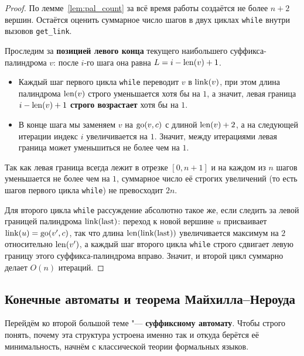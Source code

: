 \begin{proof}
    По лемме~\ref{lem:pal_count} за всё время работы создаётся не более $n + 2$ вершин. Остаётся оценить суммарное число шагов в двух циклах \texttt{while} внутри вызовов \texttt{get\_link}.

    Проследим за \textbf{позицией левого конца} текущего наибольшего суффикса-палиндрома $v$: после $i$-го шага она равна $L = i - \operatorname{len}(v) + 1$.
    \begin{itemize}
        \item Каждый шаг первого цикла \texttt{while} переводит $v$ в $\operatorname{link}(v)$, при этом длина палиндрома $\operatorname{len}(v)$ строго уменьшается хотя бы на $1$, а значит, левая граница $i - \operatorname{len}(v) + 1$ \textbf{строго возрастает} хотя бы на $1$.
        \item В конце шага мы заменяем $v$ на $\operatorname{go}(v, c)$ с длиной $\operatorname{len}(v) + 2$, а на следующей итерации индекс $i$ увеличивается на $1$. Значит, между итерациями левая граница может уменьшиться не более чем на $1$.
    \end{itemize}
    Так как левая граница всегда лежит в отрезке $[0, n + 1]$ и на каждом из $n$ шагов уменьшается не более чем на $1$, суммарное число её строгих увеличений (то есть шагов первого цикла \texttt{while}) не превосходит $2n$.

    Для второго цикла \texttt{while} рассуждение абсолютно такое же, если следить за левой границей палиндрома $\operatorname{link}(\text{last})$: переход к новой вершине $u$ присваивает $\operatorname{link}(u) = \operatorname{go}(v', c)$, так что длина $\operatorname{len}(\operatorname{link}(\text{last}))$ увеличивается максимум на $2$ относительно $\operatorname{len}(v')$, а каждый шаг второго цикла \texttt{while} строго сдвигает левую границу этого суффикса-палиндрома вправо. Значит, и второй цикл суммарно делает $O(n)$ итераций.
\end{proof}

\subsection{Конечные автоматы и теорема Майхилла--Нероуда}

Перейдём ко второй большой теме "--- \textbf{суффиксному автомату}. Чтобы строго понять, почему эта структура устроена именно так и откуда берётся её минимальность, начнём с классической теории формальных языков.

